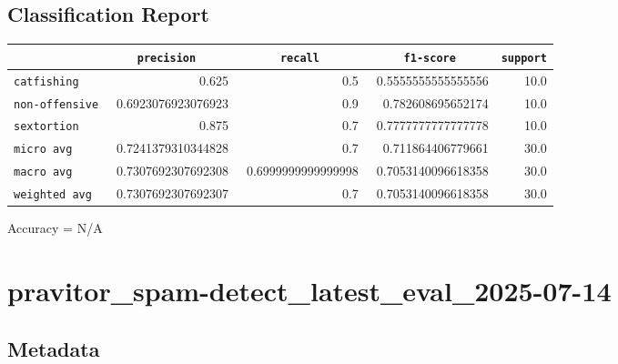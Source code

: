 \documentclass{article}
\begin{document}
\subsection{Classification Report}

\begin{center}
\begin{tabular}{l | r | r | r | r} \hline
    \verb|            | & \verb|    precision     | & \verb|      recall      | & \verb|     f1-score     | & \verb|support| \\ \hline
    \hline
    \verb|catfishing | & 0.625 & 0.5 & 0.5555555555555556 &    10.0 \\ \hline
    \verb|non-offensive| & 0.6923076923076923 & 0.9 & 0.782608695652174 &    10.0 \\ \hline
    \verb|sextortion | & 0.875 & 0.7 & 0.7777777777777778 &    10.0 \\ \hline
    \verb|micro avg  | & 0.7241379310344828 & 0.7 & 0.711864406779661 &    30.0 \\ \hline
    \verb|macro avg  | & 0.7307692307692308 & 0.6999999999999998 & 0.7053140096618358 &    30.0 \\ \hline
    \verb|weighted avg| & 0.7307692307692307 & 0.7 & 0.7053140096618358 &    30.0 \\ \hline
\end{tabular}
\end{center}

\begin{center}
Accuracy = N/A
\end{center}

\section{pravitor\_spam-detect\_latest\_eval\_2025-07-14}
\subsection{Metadata}
\end{document}
